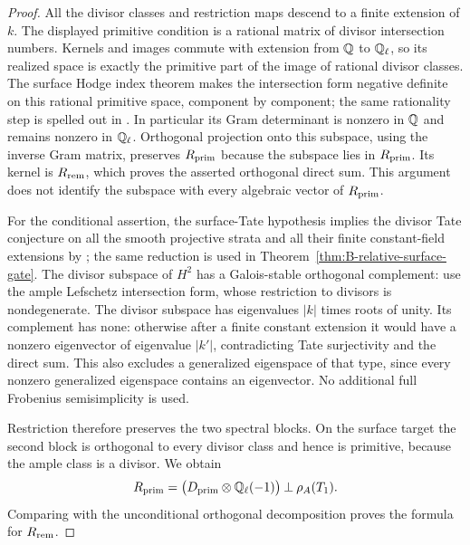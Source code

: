 \begin{proof}
All the divisor classes and restriction maps descend to a
finite extension of $k$.  The displayed primitive condition
is a rational matrix of divisor intersection numbers.
Kernels and images commute with extension from $\mathbb Q$ to
$\mathbb Q_\ell$, so its realized space is exactly the primitive
part of the image of rational divisor classes.
The surface Hodge index theorem makes the intersection
form negative definite on this rational primitive space,
component by component; the same rationality step is
spelled out in
\citet[Claim~4.6 and its full proof, author pp.~12--13]
{c_ito2004threefolds}.
In particular its Gram determinant is nonzero in $\mathbb Q$ and
remains nonzero in $\mathbb Q_\ell$.
Orthogonal projection onto this subspace, using the inverse
Gram matrix, preserves $R_{\rm prim}$ because the subspace
lies in $R_{\rm prim}$.  Its kernel is $R_{\rm rem}$, which
proves the asserted orthogonal direct sum.  This argument
does not identify the subspace with every algebraic vector
of $R_{\rm prim}$.

For the conditional assertion, the surface-Tate hypothesis
implies the divisor Tate conjecture on all the smooth
projective strata and all their finite constant-field
extensions by
\citet[Theorem~8, pp.~89--90]{BKahn2023Divisors};
the same reduction is used in
Theorem~\ref{thm:B-relative-surface-gate}.
The divisor subspace of $H^2$ has a Galois-stable orthogonal
complement: use the ample Lefschetz intersection form,
whose restriction to divisors is nondegenerate.
The divisor subspace has eigenvalues $|k|$ times roots of
unity.  Its complement has none: otherwise after a finite
constant extension it would have a nonzero eigenvector of
eigenvalue $|k'|$, contradicting Tate surjectivity and the
direct sum.  This also excludes a generalized eigenspace
of that type, since every nonzero generalized eigenspace
contains an eigenvector.  No additional full Frobenius
semisimplicity is used.

Restriction therefore preserves the two spectral blocks.
On the surface target the second block is orthogonal to
every divisor class and hence is primitive, because the
ample class is a divisor.  We obtain
\[
 R_{\rm prim}
   =\bigl(D_{\rm prim}\otimes\mathbb Q_\ell(-1)\bigr)
        \mathbin{\perp}\rho_A(T_1).
\]
Comparing with the unconditional orthogonal decomposition
proves the formula for $R_{\rm rem}$.
\end{proof}

